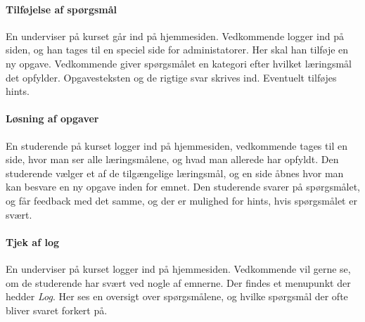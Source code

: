 \documentclass[12pt]{article}
\begin{document}
\paragraph{Tilføjelse af spørgsmål}
En underviser på kurset går ind på hjemmesiden. Vedkommende logger ind på siden, og han tages til en speciel side for administatorer.
Her skal han tilføje en ny opgave. Vedkommende giver spørgsmålet en kategori efter hvilket læringsmål det opfylder. Opgavesteksten og de rigtige svar skrives ind. Eventuelt tilføjes hints.

\paragraph{Løsning af opgaver}
En studerende på kurset logger ind på hjemmesiden, vedkommende tages til en side, hvor man ser alle læringsmålene, og hvad man allerede har opfyldt. Den studerende vælger et af de tilgængelige læringsmål, og en side åbnes hvor man kan besvare en ny opgave inden for emnet. Den studerende svarer på spørgsmålet, og får feedback med det samme, og der er mulighed for hints, hvis spørgsmålet er svært.

\paragraph{Tjek af log}
En underviser på kurset logger ind på hjemmesiden. Vedkommende vil gerne se, om de studerende har svært ved nogle af emnerne. Der findes et menupunkt der hedder \emph{Log}. Her ses en oversigt over spørgsmålene, og hvilke spørgsmål der ofte bliver svaret forkert på.
\end{document}
